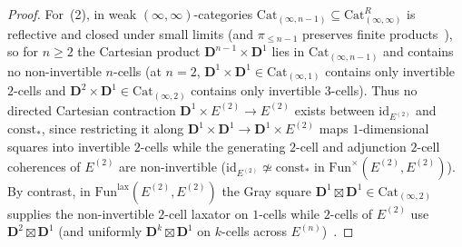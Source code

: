 \documentclass[10pt,twoside,openright]{book}
\theoremstyle{crmplain}
\theoremstyle{crmdef}
\theoremstyle{crmremark}
\begin{document}
\begin{proof}
For~(2), in weak $(\infty, \infty)$-categories $\mathrm{Cat}_{(\infty, n-1)} \subseteq \mathrm{Cat}^R_{(\infty, \infty)}$ is reflective and closed under small limits (and $\pi_{\le n-1}$ preserves finite products~\cite[Lemma~2.13]{ORW26}), so for $n \ge 2$ the Cartesian product $\mathbf{D}^{n-1} \times \mathbf{D}^1$ lies in $\mathrm{Cat}_{(\infty, n-1)}$ and contains no non-invertible $n$-cells (at $n = 2$, $\mathbf{D}^1 \times \mathbf{D}^1 \in \mathrm{Cat}_{(\infty, 1)}$ contains only invertible $2$-cells and $\mathbf{D}^2 \times \mathbf{D}^1 \in \mathrm{Cat}_{(\infty, 2)}$ contains only invertible $3$-cells). Thus no directed Cartesian contraction $\mathbf{D}^1 \times E^{(2)} \to E^{(2)}$ exists between $\mathrm{id}_{E^{(2)}}$ and $\mathrm{const}_*$, since restricting it along $\mathbf{D}^1 \times \mathbf{D}^1 \to \mathbf{D}^1 \times E^{(2)}$ maps $1$-dimensional squares into invertible $2$-cells while the generating $2$-cell and adjunction $2$-cell coherences of $E^{(2)}$ are non-invertible ($\mathrm{id}_{E^{(2)}} \not\simeq \mathrm{const}_*$ in $\mathrm{Fun}^\times(E^{(2)}, E^{(2)})$). By contrast, in $\mathrm{Fun}^{\mathrm{lax}}(E^{(2)}, E^{(2)})$ the Gray square $\mathbf{D}^1 \boxtimes \mathbf{D}^1 \in \mathrm{Cat}_{(\infty, 2)}$ supplies the non-invertible $2$-cell laxator on $1$-cells while $2$-cells of $E^{(2)}$ use $\mathbf{D}^2 \boxtimes \mathbf{D}^1$ (and uniformly $\mathbf{D}^k \boxtimes \mathbf{D}^1$ on $k$-cells across $E^{(n)}$)~\cite{GepnerHeine26,Heine26,Geiss26}.
\end{proof}
\end{document}
